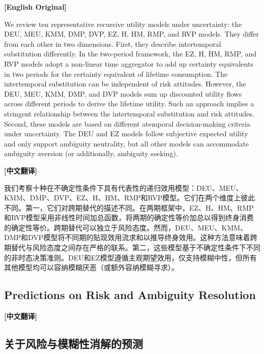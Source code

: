 \documentclass[12pt,a4paper]{ctexart}
\newenvironment{original}{%
  \par\medskip\noindent\textbf{[English Original]}\par\smallskip
  \color{black}\small
}{%
  \par\medskip
}
\newenvironment{translation}{%
  \par\noindent\textbf{[中文翻译]}\par\smallskip
  \color{blue}\small
}{%
  \par\bigskip
}
\theoremstyle{definition}
\theoremstyle{remark}
\begin{document}
\begin{original}
We review ten representative recursive utility models under uncertainty: the DEU, MEU, KMM, DMP, DVP, EZ, H, HM, RMP, and RVP models. They differ from each other in two dimensions. First, they describe intertemporal substitution differently. In the two-period framework, the EZ, H, HM, RMP, and RVP models adopt a non-linear time aggregator to add up certainty equivalents in two periods for the certainty equivalent of lifetime consumption. The intertemporal substitution can be independent of risk attitudes. However, the DEU, MEU, KMM, DMP, and DVP models sum up discounted utility flows across different periods to derive the lifetime utility. Such an approach implies a stringent relationship between the intertemporal substitution and risk attitudes. Second, these models are based on different atemporal decision-making criteria under uncertainty. The DEU and EZ models follow subjective expected utility and only support ambiguity neutrality, but all other models can accommodate ambiguity aversion (or additionally, ambiguity seeking).
\end{original}
\begin{translation}
我们考察十种在不确定性条件下具有代表性的递归效用模型：DEU、MEU、KMM、DMP、DVP、EZ、H、HM、RMP和RVP模型。它们在两个维度上彼此不同。第一，它们对跨期替代的描述不同。在两期框架中，EZ、H、HM、RMP和RVP模型采用非线性时间加总函数，将两期的确定性等价加总以得到终身消费的确定性等价。跨期替代可以独立于风险态度。然而，DEU、MEU、KMM、DMP和DVP模型将不同期的贴现效用流求和以推导终身效用。这种方法意味着跨期替代与风险态度之间存在严格的联系。第二，这些模型基于不确定性条件下不同的非时态决策准则。DEU和EZ模型遵循主观期望效用，仅支持模糊中性，但所有其他模型均可以容纳模糊厌恶（或额外容纳模糊寻求）。
\end{translation}

\subsection{Predictions on Risk and Ambiguity Resolution}
\begin{translation}
\subsection*{关于风险与模糊性消解的预测}
\end{translation}
\end{document}
